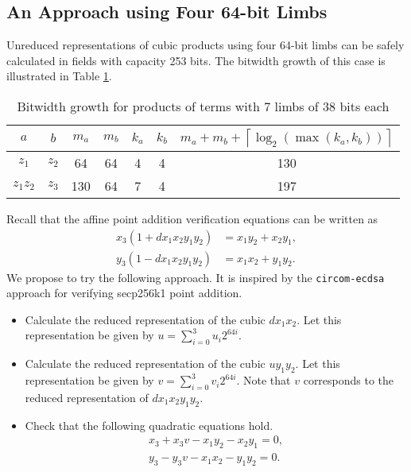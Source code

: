 \documentclass[a4paper, 12pt]{article}
\begin{document}
\newpage
\subsection{An Approach using Four 64-bit Limbs}%
\label{subsec:an_approach_using_four_64_bit_limbs}
Unreduced representations of cubic products using four 64-bit limbs can be safely calculated in fields with capacity 253 bits. The bitwidth growth of this case is illustrated in Table \ref{tab:limb64}.
\begin{table}[h]
  \centering
  \begin{tabular}{c|c|c|c|c|c|c}
    $a$ & $b$ & $m_a$ & $m_b$ & $k_a$ & $k_b$ & $m_a+m_b+\left\lceil \log_2 \left( \max\left( k_a, k_b \right) \right) \right\rceil$ \\ \hline
    $z_1$ & $z_2$ & 64 & 64 & 4 & 4 & 130 \\ \hline
    $z_1z_2$ & $z_3$ & 130 & 64 & 7 & 4 & 197 \\ \hline
  \end{tabular}
  \caption{Bitwidth growth for products of terms with 7 limbs of 38 bits each}
  \label{tab:limb64}
\end{table}

Recall that the affine point addition verification equations can be written as
\begin{align*}
  x_3(1+dx_1x_2y_1y_2) &= x_1y_2 + x_2y_1,\\
  y_3(1-dx_1x_2y_1y_2) &= x_1x_2 + y_1y_2.
  \label{eqn:additionAffineVerification}
\end{align*}
We propose to try the following approach. It is inspired by the \texttt{circom-ecdsa} approach for verifying secp256k1 point addition.
\begin{itemize}
  \item Calculate the reduced representation of the cubic $dx_1x_2$. Let this representation be given by $u = \sum_{i=0}^{3}u_i 2^{64i}$.
  \item Calculate the reduced representation of the cubic $uy_1y_2$. Let this representation be given by $v = \sum_{i=0}^{3}v_i 2^{64i}$. Note that $v$ corresponds to the reduced representation of $dx_1x_2y_1y_2$.
  \item Check that the following quadratic equations hold.
    \begin{align*}
      x_3 + x_3 v - x_1y_2 - x_2y_1 = 0,\\
      y_3 - y_3 v - x_1x_2 - y_1y_2 = 0.\\
    \end{align*}
\end{itemize}
\end{document}
